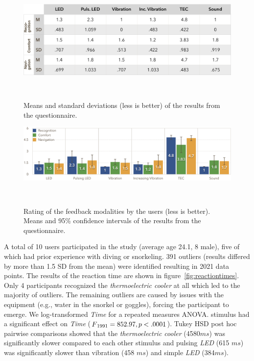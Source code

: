 \begin{figure}
	\includegraphics[width=\columnwidth]{images/m_sd_table_noranking}
	\caption{Means and standard deviations (less is better) of the results from the questionnaire.}~\label{fig:m_sd_table}
\end{figure}

\begin{figure}
	\includegraphics[width=\columnwidth]{images/GraphQuestionnaireNoranking.png}
	\caption{Rating of the feedback modalities by the users (less is better). Means and 95\% confidence intervals of the results from the questionnaire.}~\label{fig:questionnaire}
\end{figure}

A total of 10 users participated in the study (average age 24.1, 8 male), five of which had prior experience with diving or snorkeling. 
391 outliers (results differed by more than 1.5 SD from the mean) were identified resulting in 2021 data points.
The results of the reaction time are shown in figure~\ref{fig:reactiontimes}.
Only 4 participants recognized the \emph{thermoelectric cooler} at all which led to the majority of outliers. 
The remaining outliers are caused by issues with the equipment (e.g., water in the snorkel or goggles), forcing the participant to emerge.
We log-transformed \emph{Time} for a repeated measures ANOVA. 
{\sc stimulus} had a significant effect on \emph{Time} ($F\textsubscript{1991} = 852.97, p<.0001$). 
Tukey HSD post hoc pairwise comparisons showed that the \emph{thermoelectric cooler} (4580$ms$) was significantly slower compared to each other {\sc stimulus} and pulsing \emph{LED} (615 $ms$) was significantly slower than vibration (458 $ms$) and simple \emph{LED} (384$ms$).

